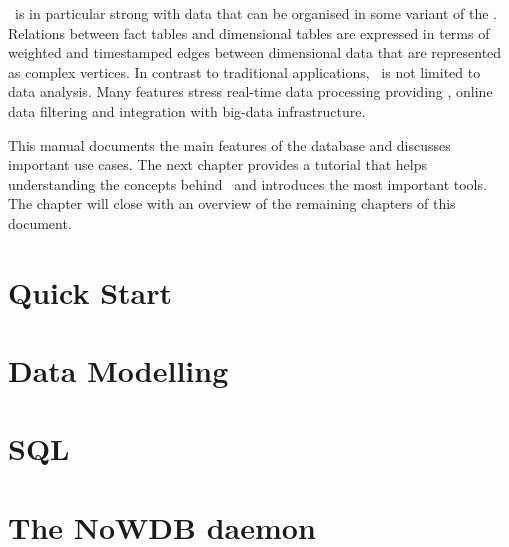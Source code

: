 \documentclass{scrreprt}
\begin{document}
\nowdb\ is in particular strong with
data that can be organised in some variant of the
. Relations between
fact tables and dimensional tables
are expressed in terms of
weighted and timestamped edges
between dimensional data that
are represented as complex vertices.
In contrast to traditional
 applications,
\nowdb\ is not limited to data analysis.
Many features stress real-time data
processing providing ,
online data filtering and integration with big-data
infrastructure.

\newpage
This manual documents the main features
of the database and discusses important
use cases. The next chapter provides
a  tutorial that helps
understanding the concepts behind \nowdb\
and introduces the most important tools.
The chapter will close
with an overview of the remaining
chapters of this document.


\chapter{Quick Start}\label{chpt_quickst}


\chapter{Data Modelling}\label{chpt_model}

\chapter{SQL}\label{chpt_sql}


\chapter{The NoWDB daemon}\label{chpt_nowdbd}
\end{document}
